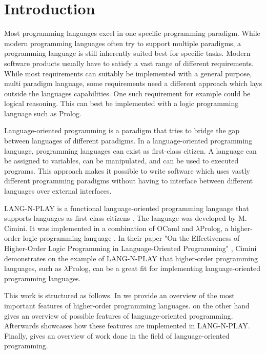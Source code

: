 
\section{Introduction}
\label{introduction}
Most programming languages excel in one specific programming paradigm. While modern programming languages often try to support multiple paradigms, a programming language is still inherently suited best for specific tasks. Modern software products usually have to satisfy a vast range of different requirements. While most requirements can suitably be implemented with a general purpose, multi paradigm language, some requirements need a different approach which lays outside the languages capabilities. One such requirement for example could be logical reasoning. This can best be implemented with a logic programming language such as Prolog. 

Language-oriented programming is a paradigm that tries to bridge the gap between languages of different paradigms. In a language-oriented programming language, programming languages can exist as first-class citizen. A language can be assigned to variables, can be manipulated, and can be used to executed programs. This approach makes it possible to write software which uses vastly different programming paradigms without having to interface between different languages over external interfaces.

LANG-N-PLAY is a functional language-oriented programming language that supports languages as first-class citizens \cite{cimini_effectiveness_2020,cimini_lang-n-play_2018,cimini_languages_2018}. The language was developed by M. Cimini. It was implemented in a combination of OCaml and $\lambda$Prolog, a higher-order logic programming language \cite{miller_programming_2012}. In their paper "On the Effectiveness of Higher-Order Logic Programming in Language-Oriented Programming" \cite{cimini_effectiveness_2020}, Cimini demonstrates on the example of LANG-N-PLAY that higher-order programming languages, such as $\lambda$Prolog, can be a great fit for implementing language-oriented programming languages.

This work is structured as follows. In  we provide an overview of the most important features of higher-order programming languages.  on the other hand gives an overview of possible features of language-oriented programming. Afterwards  showcases how these features are implemented in LANG-N-PLAY. Finally,  gives an overview of work done in the field of language-oriented programming.
